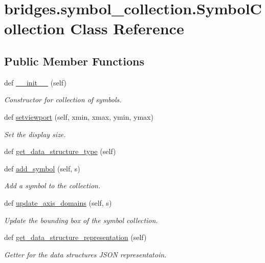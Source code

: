\hypertarget{classbridges_1_1symbol__collection_1_1_symbol_collection}{}\section{bridges.\+symbol\+\_\+collection.\+Symbol\+Collection Class Reference}
\label{classbridges_1_1symbol__collection_1_1_symbol_collection}
\subsection*{Public Member Functions}
\begin{DoxyCompactItemize}
\item 
def \hyperlink{classbridges_1_1symbol__collection_1_1_symbol_collection_a7ba838d831a2dce6d74fe920c7de52fd}{\+\_\+\+\_\+init\+\_\+\+\_\+} (self)
\begin{DoxyCompactList}\small\item\em Constructor for collection of symbols. \end{DoxyCompactList}\item 
def \hyperlink{classbridges_1_1symbol__collection_1_1_symbol_collection_ac17f093a6731545509d5b5e94484ab7a}{setviewport} (self, xmin, xmax, ymin, ymax)
\begin{DoxyCompactList}\small\item\em Set the display size. \end{DoxyCompactList}\item 
def \hyperlink{classbridges_1_1symbol__collection_1_1_symbol_collection_a84a2d68da2df79389b6bec06ee99f72d}{get\+\_\+data\+\_\+structure\+\_\+type} (self)
\item 
def \hyperlink{classbridges_1_1symbol__collection_1_1_symbol_collection_a11e36a56b1d7dbf23175d4b1ab3cd378}{add\+\_\+symbol} (self, s)
\begin{DoxyCompactList}\small\item\em Add a symbol to the collection. \end{DoxyCompactList}\item 
def \hyperlink{classbridges_1_1symbol__collection_1_1_symbol_collection_af0906b48ee3ee868bb7779561d3f710c}{update\+\_\+axis\+\_\+domains} (self, s)
\begin{DoxyCompactList}\small\item\em Update the bounding box of the symbol collection. \end{DoxyCompactList}\item 
def \hyperlink{classbridges_1_1symbol__collection_1_1_symbol_collection_a09fb16fe5f14457654e5f2680131ccc9}{get\+\_\+data\+\_\+structure\+\_\+representation} (self)
\begin{DoxyCompactList}\small\item\em Getter for the data structure\textquotesingle{}s J\+S\+ON representatoin. \end{DoxyCompactList}\end{DoxyCompactItemize}


